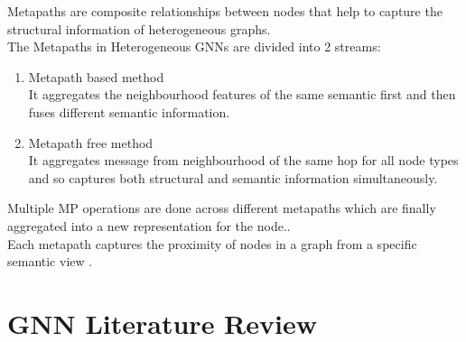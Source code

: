 \documentclass{report} %
\begin{document}
Metapaths are composite relationships between nodes that help to capture the structural information of heterogeneous graphs.\\

The Metapaths in Heterogeneous \ac{GNN}s are divided into 2 streams:
\begin{enumerate}
    \item Metapath based method\\
    It aggregates the neighbourhood features of the same semantic first and then fuses different semantic information.
    \item Metapath free method\\
    It aggregates message from neighbourhood of the same hop for all node types and so captures both structural and semantic information simultaneously.
\end{enumerate}

Multiple \ac{MP} operations are done across different metapaths which are finally aggregated into a new representation for the node.\cite{ML HGNN-2023}.\\
Each metapath captures the proximity of nodes in a graph from a specific semantic view \cite{HGNN-2020}.

\section{\ac{GNN} Literature Review}\label{sec:GNN Literature Review}
\end{document}
